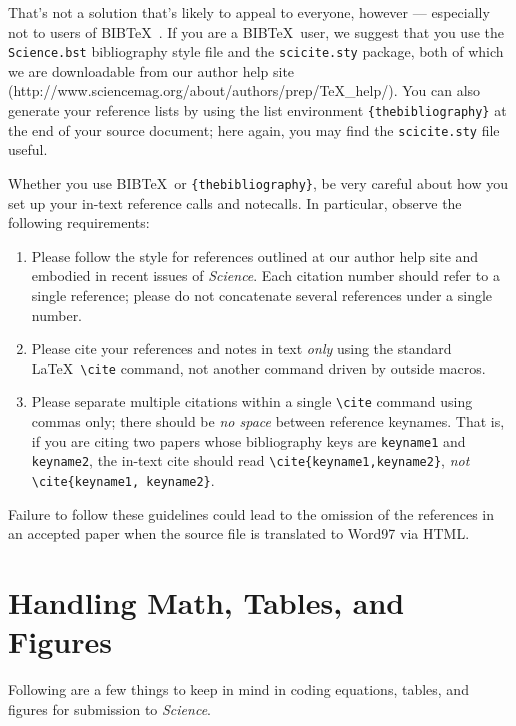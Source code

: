 \documentclass[12pt]{article}
\begin{document}
That's not a solution that's likely to appeal to everyone, however ---
especially not to users of B{\small{IB}}\TeX\ \cite{inclme}.  If you
are a B{\small{IB}}\TeX\ user, we suggest that you use the
\texttt{Science.bst} bibliography style file and the
\texttt{scicite.sty} package, both of which we are downloadable from our author help site
(http://www.sciencemag.org/about/authors/prep/TeX_help/).  You can also
generate your reference lists by using the list environment
\texttt{\{thebibliography\}} at the end of your source document; here
again, you may find the \texttt{scicite.sty} file useful.

Whether you use B{\small{IB}}\TeX\ or \texttt{\{thebibliography\}}, be
very careful about how you set up your in-text reference calls and
notecalls.  In particular, observe the following requirements:

\begin{enumerate}
\item Please follow the style for references outlined at our author
  help site and embodied in recent issues of {\it Science}.  Each
  citation number should refer to a single reference; please do not
  concatenate several references under a single number.
\item Please cite your references and notes in text {\it only\/} using
  the standard \LaTeX\ \verb+\cite+ command, not another command
  driven by outside macros.
\item Please separate multiple citations within a single \verb+\cite+
  command using commas only; there should be {\it no space\/}
  between reference keynames.  That is, if you are citing two
  papers whose bibliography keys are \texttt{keyname1} and
  \texttt{keyname2}, the in-text cite should read
  \verb+\cite{keyname1,keyname2}+, {\it not\/}
  \verb+\cite{keyname1, keyname2}+.
\end{enumerate}

\noindent Failure to follow these guidelines could lead
to the omission of the references in an accepted paper when the source
file is translated to Word97 via HTML.

\section*{Handling Math, Tables, and Figures}

Following are a few things to keep in mind in coding equations,
tables, and figures for submission to {\it Science}.
\end{document}
